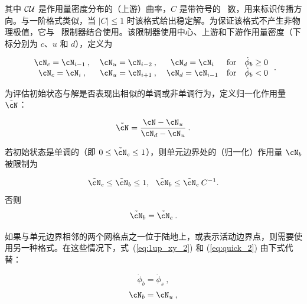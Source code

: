 \noindent
其中 $\cal CU$ 是作用量密度分布的（上游）曲率，$C$ 是带符号的 \cfl\ 数，用来标识传播方向。与一阶格式类似，当 $|C| \leq 1$ 时该格式给出稳定解。为保证该格式不产生非物理极值，它与 \ult\ 限制器结合使用。该限制器使用中心、上游和下游作用量密度（下标分别为 $c$、$u$ 和 $d$），定义为


\begin{equation} \begin{array}{ccccc}
\cN_c = \cN_{i-1} \: , \: & \cN_u = \cN_{ i-2 } \: , \: &
                            \cN_d = \cN_{i} &
                            \mbox{for} & \dot{\phi}_b \geq 0 \\
\cN_c = \cN_{ i } \: , \: & \cN_u = \cN_{i+1} \: , \: &
                            \cN_d = \cN_{i-1} &
                            \mbox{for} & \dot{\phi}_b   <  0
\end{array} \: . \label{eq:ult_1} \end{equation}

\noindent
为评估初始状态与解是否表现出相似的单调或非单调行为，定义归一化作用量 $\tilde\cN$：

\begin{equation}
\tilde\cN = \frac{\cN-\cN_u}{\cN_d - \cN_u} 
\: . \label{eq:ult_2} \end{equation}

\noindent
若初始状态是单调的（即 $0 \leq \tilde\cN_c \leq 1$），则单元边界处的（归一化）作用量 $\cN_b$ 被限制为

\begin{equation}
\tilde\cN_c \leq \tilde\cN_b \leq 1 , \:\:\:
\tilde\cN_b \leq \tilde\cN_c \: C^{-1}  . 
\label{eq:ult_3} \end{equation}
\noindent 否则 \begin{equation}
\tilde\cN_b = \tilde\cN_c 
\: . \label{eq:ult_4} \end{equation}

\noindent
如果与单元边界相邻的两个网格点之一位于陆地上，或表示活动边界点，则需要使用另一种格式。在这些情况下，式~(\ref{eq:1up_xy_2}) 和 (\ref{eq:quick_2}) 由下式代替：


\begin{equation}
\dot{\phi}_b = \dot{\phi}_s \: ,
\label{eq:1_vel} \end{equation} \begin{equation}
\cN_b = \cN_u \: ,
\label{eq:1_bval} \end{equation}

